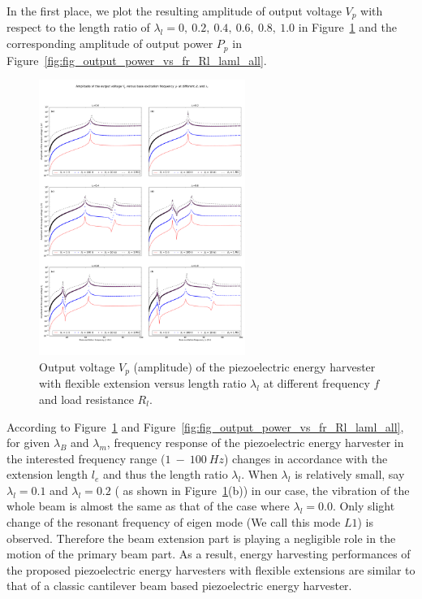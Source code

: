 \documentclass{elsarticle}
\begin{document}
In the first place, we plot the resulting amplitude of output voltage $V_p$ with respect to the length ratio of $\lambda_l = 0,\ 0.2,\ 0.4,\ 0.6,\ 0.8,\ 1.0$ in Figure~\ref{fig:fig_output_voltage_vs_fr_Rl_laml_all} and the corresponding amplitude of output power $P_p$ in Figure~\ref{fig:fig_output_power_vs_fr_Rl_laml_all}.

\begin{figure}[!htbp]
    \centering
    \includegraphics[width=0.6\textwidth]{./fig_output_voltage_vs_fr_Rl_laml_all}
    \caption{Output voltage $V_p$ (amplitude) of the piezoelectric energy harvester with flexible extension versus length ratio $\lambda_l$ at different frequency $f$ and load resistance $R_l$. }
    \label{fig:fig_output_voltage_vs_fr_Rl_laml_all}
\end{figure}

According to Figure~\ref{fig:fig_output_voltage_vs_fr_Rl_laml_all} and Figure~\ref{fig:fig_output_power_vs_fr_Rl_laml_all}, for given $\lambda_B$ and $\lambda_m$, frequency response of the piezoelectric energy harvester in the interested frequency range ($1\ - \ 100\ Hz$) changes in accordance with the 
extension length $l_e$ and thus the length ratio $\lambda_l$. When $\lambda_l$ is relatively small, say $\lambda_l = 0.1$ and $\lambda_l = 0.2$ ( as shown in Figure~\ref{fig:fig_output_voltage_vs_fr_Rl_laml_all}(b)) in our case, the vibration of the whole beam is almost the same as that of the case where $\lambda_l = 0.0$. Only slight change of the resonant frequency of eigen mode (We call this mode $L1$) is observed. Therefore the beam extension part is playing a negligible role in the motion of the primary beam part. As a result, energy harvesting performances of the proposed piezoelectric energy harvesters with flexible extensions are similar to that of a classic cantilever beam based piezoelectric energy harvester. 
\end{document}
